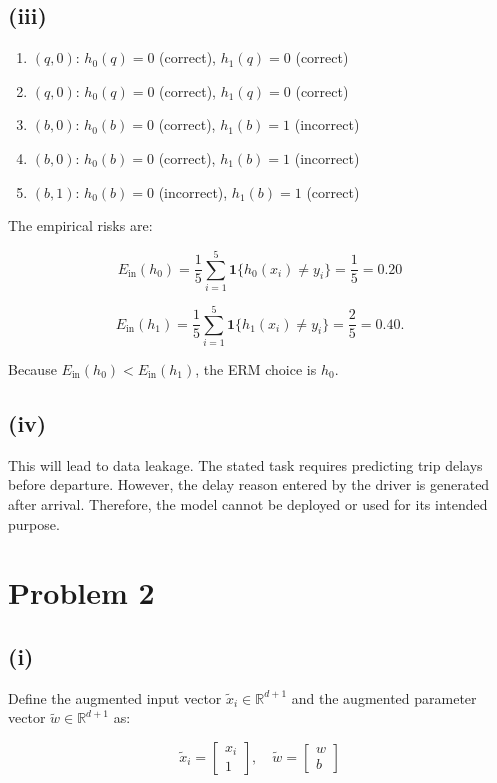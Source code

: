 \documentclass[11pt]{article}
\begin{document}
\subsection*{(iii)}

\begin{enumerate}
    \item $(q, 0)$: $h_0(q)=0$ (correct), $h_1(q)=0$ (correct)
    \item $(q, 0)$: $h_0(q)=0$ (correct), $h_1(q)=0$ (correct)
    \item $(b, 0)$: $h_0(b)=0$ (correct), $h_1(b)=1$ (incorrect)
    \item $(b, 0)$: $h_0(b)=0$ (correct), $h_1(b)=1$ (incorrect)
    \item $(b, 1)$: $h_0(b)=0$ (incorrect), $h_1(b)=1$ (correct)
\end{enumerate}

The empirical risks are:

$$
E_{\text{in}}(h_0) = \frac{1}{5} \sum_{i=1}^5 \mathbf{1}\{h_0(x_i) \neq y_i\} = \frac{1}{5} = 0.20
$$

$$
E_{\text{in}}(h_1) = \frac{1}{5} \sum_{i=1}^5 \mathbf{1}\{h_1(x_i) \neq y_i\} = \frac{2}{5} = 0.40.
$$

Because $E_{\text{in}}(h_0) < E_{\text{in}}(h_1)$, the ERM choice is $h_0$.

\subsection*{(iv)}

This will lead to data leakage. The stated task requires predicting trip delays before departure. However, the delay reason entered by the driver is generated after arrival. Therefore, the model cannot be deployed or used for its intended purpose.

\newpage

\section*{Problem 2}

\subsection*{(i)}

Define the augmented input vector $\tilde{x}_i \in \mathbb{R}^{d+1}$ and the augmented parameter vector $\tilde{w} \in \mathbb{R}^{d+1}$ as:

$$
\tilde{x}_i = \begin{bmatrix} x_i \\ 1 \end{bmatrix}, \quad \tilde{w} = \begin{bmatrix} w \\ b \end{bmatrix}
$$
\end{document}
